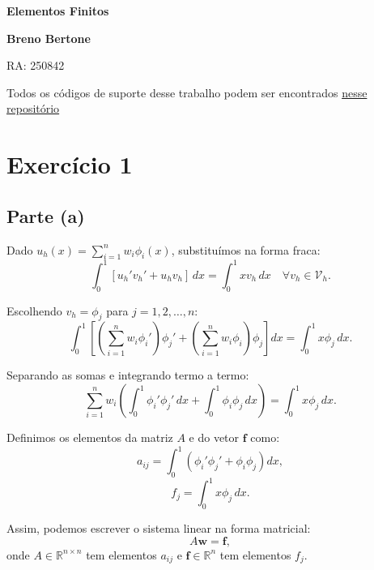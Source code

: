 \documentclass{article}
\begin{document}
\begin{titlepage}
    \centering
    \vspace*{2cm}
    
    \Huge
    \textbf{Elementos Finitos}
    
    \vspace{1.5cm}
    
    \Large
    \textbf{Breno Bertone}
    
    \vspace{0.5cm}
    
    \Large
    RA: 250842
    
    \vfill
    
    \vspace{0.8cm}
    
    
    \vspace{1.5cm}    
    
\end{titlepage}

Todos os códigos de suporte desse trabalho podem ser encontrados \href{https://github.com/Bertonebreno/finite-elements}{nesse repositório}

\section{Exercício 1}
\subsection{Parte (a)}

Dado \( u_h(x) = \sum_{i=1}^n w_i \phi_i(x) \), substituímos na forma fraca:
\[
\int_0^1 [u_h' v_h' + u_h v_h] \, dx = \int_0^1 x v_h \, dx \quad \forall v_h \in \mathcal{V}_h.
\]

Escolhendo \( v_h = \phi_j \) para \( j = 1, 2, \ldots, n \):
\[
\int_0^1 \left[ \left( \sum_{i=1}^n w_i \phi_i' \right) \phi_j' + \left( \sum_{i=1}^n w_i \phi_i \right) \phi_j \right] dx = \int_0^1 x \phi_j \, dx.
\]

Separando as somas e integrando termo a termo:
\[
\sum_{i=1}^n w_i \left( \int_0^1 \phi_i' \phi_j' \, dx + \int_0^1 \phi_i \phi_j \, dx \right) = \int_0^1 x \phi_j \, dx.
\]

Definimos os elementos da matriz \( A \) e do vetor \( \mathbf{f} \) como:
\[
a_{ij} = \int_0^1 \left( \phi_i' \phi_j' + \phi_i \phi_j \right) dx,
\]
\[
f_j = \int_0^1 x \phi_j \, dx.
\]

Assim, podemos escrever o sistema linear na forma matricial:
\[
A \mathbf{w} = \mathbf{f},
\]
onde \( A \in \mathbb{R}^{n \times n} \) tem elementos \( a_{ij} \) e \( \mathbf{f} \in \mathbb{R}^n \) tem elementos \( f_j \).
\end{document}
